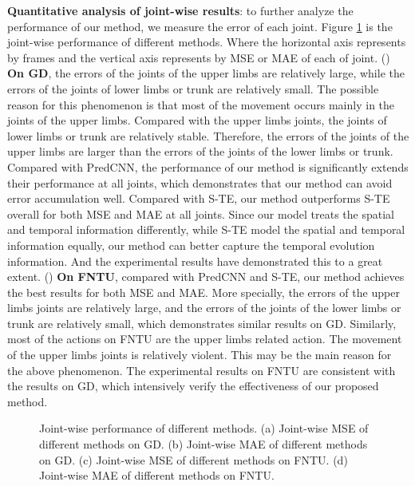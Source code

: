 \documentclass[journal]{IEEEtran}
\begin{document}
{\bf Quantitative analysis of joint-wise results}: to further analyze the performance of our method, we measure the error of each joint. Figure \ref{fig7} is the joint-wise performance of different methods. Where the horizontal axis represents by frames and the vertical axis represents by MSE or MAE of each of joint. () {\bf On GD}, the errors of the joints of the upper limbs are relatively large, while the errors of the joints of lower limbs or trunk are relatively small. The possible reason for this phenomenon is that most of the movement occurs mainly in the joints of the upper limbs. Compared with the upper limbs joints, the joints of lower limbs or trunk are relatively stable. Therefore, the errors of the joints of the upper limbs are larger than the errors of the joints of the lower limbs or trunk. Compared with PredCNN, the performance of our method is significantly extends their performance at all joints, which demonstrates that our method can avoid error accumulation well. Compared with S-TE, our method outperforms S-TE overall for both MSE and MAE at all joints. Since our model treats the spatial and temporal information differently, while S-TE model the spatial and temporal information equally, our method can better capture the temporal evolution information. And the experimental results have demonstrated this to a great extent. () {\bf On FNTU}, compared with PredCNN and S-TE, our method achieves the best results for both MSE and MAE. More specially, the errors of the upper limbs joints are relatively large, and the errors of the joints of the lower limbs or trunk are relatively small, which demonstrates similar results on GD. Similarly, most of the actions on FNTU are the upper limbs related action. The movement of the upper limbs joints is relatively violent. This may be the main reason for the above phenomenon. The experimental results on FNTU are consistent with the results on GD, which intensively verify the effectiveness of our proposed method.


\begin{figure}[!t]
\centering
{}
\hfil
{}
\hfil
{}
\hfil
{}
\caption{Joint-wise performance of different methods. (a) Joint-wise MSE of different methods on GD. (b) Joint-wise MAE of different methods on GD. (c) Joint-wise MSE of different methods on FNTU. (d) Joint-wise MAE of different methods on FNTU. }
\label{fig7}
\end{figure}
\end{document}

